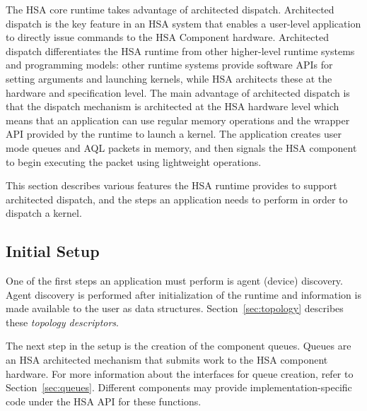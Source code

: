 \documentclass[final]{book}
\begin{document}
The HSA core runtime takes advantage of architected dispatch. Architected 
dispatch is the key feature in an HSA system that enables a user-level 
application to directly issue commands to the HSA Component hardware. 
Architected dispatch differentiates the HSA runtime from other higher-level 
runtime systems and programming models: other runtime systems provide 
software APIs for setting arguments and launching kernels, while HSA architects 
these at the hardware and specification level. The main advantage of architected 
dispatch is that the dispatch mechanism is architected at the HSA hardware level 
which means that an application can use regular memory operations and the 
wrapper API provided by the runtime to launch a kernel. The application creates 
user mode queues and AQL packets in memory, and then signals the HSA component 
to begin executing the packet using lightweight operations.

This section describes various features the HSA runtime provides to support 
architected dispatch, and the steps an application needs to perform in order to 
dispatch a kernel.

\subsection{Initial Setup}
One of the first steps an application must perform is agent (device) discovery. 
Agent discovery is performed after initialization of the runtime and information is
made available to the user as data structures. Section~\ref{sec:topology}
describes these \textit{topology descriptors}. 

The next step in the setup is the creation of the component queues. Queues are an 
HSA architected mechanism that submits work to the HSA component hardware. For 
more information about the interfaces for queue creation, refer to 
Section~\ref{sec:queues}. Different components may provide 
implementation-specific code under the HSA API for these functions.

\end{document}
